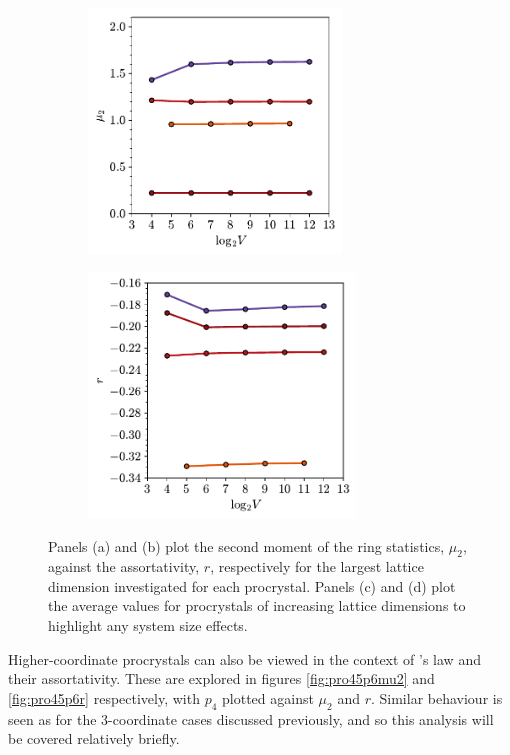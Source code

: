 \begin{figure}[bt]
     \begin{subfigure}[b]{0.45\textwidth}
         \centering
         \includegraphics[height=6.5cm]{./figures/procrystals/pro45_ss_mu2.pdf}
         \caption{}
         \label{fig:pro45p6ssmu2}
     \end{subfigure}
     \hfill
        \begin{subfigure}[b]{0.45\textwidth}
         \centering
         \includegraphics[height=6.5cm]{./figures/procrystals/pro45_ss_r.pdf}
         \caption{}
         \label{fig:pro45p6ssr}
     \end{subfigure}
     
     \caption{Panels (a) and (b) plot the second moment of the ring statistics, $\mu_2$, against the assortativity, $r$, respectively for the largest lattice dimension investigated for each procrystal. Panels (c) and (d) plot the average values for procrystals of increasing lattice dimensions to highlight any system size effects.}
     \label{fig:pro45p6mu2r}
\end{figure}

Higher\--coordinate procrystals can also be viewed in the context of \lm's law and their assortativity.
These are explored in figures \ref{fig:pro45p6mu2} and \ref{fig:pro45p6r} respectively, with $p_4$ plotted against $\mu_2$ and $r$.
Similar behaviour is seen as for the 3\--coordinate cases discussed previously, and so this analysis will be covered relatively briefly.

